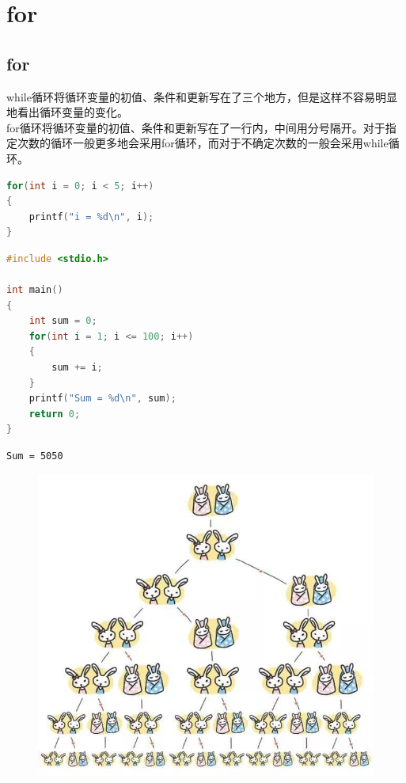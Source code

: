 \section{for}

\subsection{for}

while循环将循环变量的初值、条件和更新写在了三个地方，但是这样不容易明显地看出循环变量的变化。\\

for循环将循环变量的初值、条件和更新写在了一行内，中间用分号隔开。对于指定次数的循环一般更多地会采用for循环，而对于不确定次数的一般会采用while循环。

\begin{lstlisting}[language=C]
for(int i = 0; i < 5; i++)
{
    printf("i = %d\n", i);
}
\end{lstlisting}

\vspace{0.5cm}


\begin{lstlisting}[language=C]
#include <stdio.h>

int main()
{
    int sum = 0;
    for(int i = 1; i <= 100; i++)
    {
        sum += i;
    }
    printf("Sum = %d\n", sum);
    return 0;
}
\end{lstlisting}

\begin{tcolorbox}
    \begin{verbatim}
Sum = 5050
\end{verbatim}
\end{tcolorbox}

\vspace{0.5cm}


\begin{figure}[H]
    \centering
    \includegraphics[scale=0.5]{img/Chapter3/3-2/1.png}
\end{figure}

